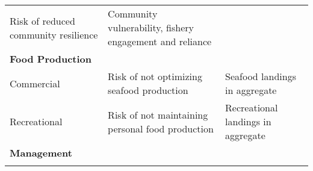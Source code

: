 \documentclass[11pt,]{article}
\begin{document}
\begin{longtable}[]{@{}lll@{}}
\begin{minipage}[t]{0.33\columnwidth}
Risk of reduced community resilience\strut
\end{minipage} & \begin{minipage}[t]{0.33\columnwidth}\raggedright\strut
Community vulnerability, fishery engagement and reliance\strut
\end{minipage}\tabularnewline
\begin{minipage}[t]{0.25\columnwidth}\raggedright\strut
\textbf{Food Production}\strut
\end{minipage} & \begin{minipage}[t]{0.33\columnwidth}\raggedright\strut
\strut
\end{minipage} & \begin{minipage}[t]{0.33\columnwidth}\raggedright\strut
\strut
\end{minipage}\tabularnewline
\begin{minipage}[t]{0.25\columnwidth}\raggedright\strut
Commercial\strut
\end{minipage} & \begin{minipage}[t]{0.33\columnwidth}\raggedright\strut
Risk of not optimizing seafood production\strut
\end{minipage} & \begin{minipage}[t]{0.33\columnwidth}\raggedright\strut
Seafood landings in aggregate\strut
\end{minipage}\tabularnewline
\begin{minipage}[t]{0.25\columnwidth}\raggedright\strut
Recreational\strut
\end{minipage} & \begin{minipage}[t]{0.33\columnwidth}\raggedright\strut
Risk of not maintaining personal food production\strut
\end{minipage} & \begin{minipage}[t]{0.33\columnwidth}\raggedright\strut
Recreational landings in aggregate\strut
\end{minipage}\tabularnewline
\begin{minipage}[t]{0.25\columnwidth}\raggedright\strut
\textbf{Management}\strut
\end{minipage} & \begin{minipage}[t]{0.33\columnwidth}\raggedright\strut
\strut
\end{minipage} & \begin{minipage}[t]{0.33\columnwidth}\raggedright\strut
\strut
\end{minipage}\tabularnewline
\begin{minipage}[t]{0.25\columnwidth}\raggedright\strut

\end{minipage}
\end{longtable}
\end{document}
